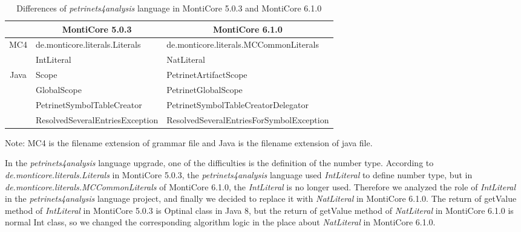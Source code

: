\begin{table}
  \begin{threeparttable}
    \caption{Differences of \emph{petrinets4analysis} language in MontiCore 5.0.3 and MontiCore 6.1.0}
    \label{tab:diff-table}
     \begin{tabular}{|c|l|l|}
        \hline
        \multicolumn{1}{|l|}{} & \multicolumn{1}{c|}{MontiCore 5.0.3} & \multicolumn{1}{c|}{MontiCore 6.1.0}     \\ \hline
        \multirow{2}{*}{MC4}    & de.monticore.literals.Literals       & de.monticore.literals.MCCommonLiterals   \\ \cline{2-3} 
                              & IntLiteral                 & NatLiteral                          \\ \hline
        \multirow{4}{*}{Java} & Scope                      & PetrinetArtifactScope               \\ \cline{2-3} 
                              & GlobalScope                & PetrinetGlobalScope                 \\ \cline{2-3} 
                              & PetrinetSymbolTableCreator & PetrinetSymbolTableCreatorDelegator \\ \cline{2-3} 
                              & ResolvedSeveralEntriesException      & ResolvedSeveralEntriesForSymbolException \\ \hline
    \end{tabular}
    \begin{tablenotes}
      \small
      \item Note: MC4 is the filename extension of grammar file and Java is the filename extension of java file.
    \end{tablenotes}
  \end{threeparttable}
\end{table}

In the \emph{petrinets4analysis} language upgrade, one of the difficulties is the definition of the number type. According to \emph{de.monticore.literals.Literals} in MontiCore 5.0.3, the \emph{petrinets4analysis} language used \emph{IntLiteral} to define number type, but in \emph{de.monticore.literals.MCCommonLiterals} of MontiCore 6.1.0, the \emph{IntLiteral} is no longer used. Therefore we analyzed the role of \emph{IntLiteral} in the \emph{petrinets4analysis} language project, and finally we decided to replace it with \emph{NatLiteral} in MontiCore 6.1.0. The return of getValue method of \emph{IntLiteral} in MontiCore 5.0.3 is Optinal class in Java 8, but the return of getValue method of \emph{NatLiteral} in MontiCore 6.1.0 is normal Int class, so we changed the corresponding algorithm logic in the place about \emph{NatLiteral} in MontiCore 6.1.0. \\

